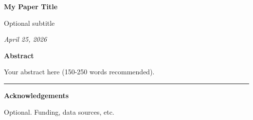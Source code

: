 \documentclass[12pt]{article}
\newif\ifjncanon
\begin{document}
\else
\begin{titlepage}
\thispagestyle{empty}

\vspace*{0.06\textheight}
\begin{center}

{\LARGE\bfseries My Paper Title\par}

\vspace{0.25em}
{\large Optional subtitle\par}

\vspace{2em}

\begin{singlespace}
{\normalsize

\jncauthorblock

\ifjncanon\else
\vspace{0.5em}
\textit{April 25, 2026}\par
\fi

}
\end{singlespace}

\vfill

\begin{minipage}{0.8\textwidth}
\small\singlespacing
\textbf{Abstract}\par\vspace{0.25em}
Your abstract here (150-250 words recommended).
\end{minipage}

\vfill

\ifjncanon\else
\begin{minipage}{0.8\textwidth}
\footnotesize\singlespacing
\noindent\rule{0.3\textwidth}{0.4pt}\par
\textbf{Acknowledgements}\par
Optional. Funding, data sources, etc.
\end{minipage}
\fi

\end{center}
\end{titlepage}
\fi

\clearpage
\setcounter{page}{1}

\end{document}
